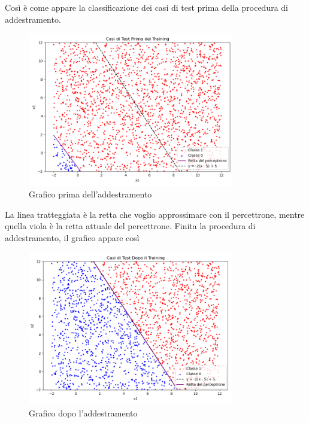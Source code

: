 \newpage

Così è come appare la classificazione dei casi di test prima della procedura di addestramento.

\begin{figure}[H]
    \centering
    \includegraphics[width=0.80\textwidth]{Immagini/Grafici/EsempioApplicativoPercettrone_parte1.png}
    \caption{Grafico prima dell'addestramento}
    \label{fig:Modellazione1 }
\end{figure}

La linea tratteggiata è la retta che voglio approssimare con il percettrone, mentre 
quella viola è la retta attuale del percettrone.
Finita la procedura di addestramento, il grafico appare così
\begin{figure}[H]
    \centering
    \includegraphics[width=0.80\textwidth]{Immagini/Grafici/EsempioApplicativoPercettrone_parte2.png}
    \caption{Grafico dopo l'addestramento}
    \label{fig:Modellazione2 }
\end{figure}


